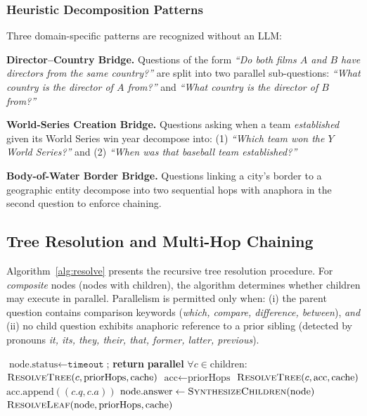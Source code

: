 \documentclass[conference]{IEEEtran}
\begin{document}
\subsubsection{Heuristic Decomposition Patterns}
\label{sec:heuristic}

Three domain-specific patterns are recognized without an LLM:

\textbf{Director--Country Bridge.}  Questions of the form
\textit{``Do both films $A$ and $B$ have directors from the same
country?''} are split into two parallel sub-questions:
\textit{``What country is the director of $A$ from?''} and
\textit{``What country is the director of $B$ from?''}

\textbf{World-Series Creation Bridge.}  Questions asking when a team
\emph{established} given its World Series win year decompose into:
(1) \textit{``Which team won the $Y$ World Series?''} and
(2) \textit{``When was that baseball team established?''}

\textbf{Body-of-Water Border Bridge.}  Questions linking a city's
border to a geographic entity decompose into two sequential hops
with anaphora in the second question to enforce chaining.

\subsection{Tree Resolution and Multi-Hop Chaining}
\label{sec:resolve}

Algorithm~\ref{alg:resolve} presents the recursive tree resolution
procedure.  For \emph{composite} nodes (nodes with children), the
algorithm determines whether children may execute in parallel.
Parallelism is permitted only when:
(i) the parent question contains comparison keywords
(\textit{which, compare, difference, between}), \emph{and}
(ii) no child question exhibits anaphoric reference to a prior sibling
(detected by pronouns \textit{it, its, they, their, that, former,
latter, previous}).

\begin{algorithm}[!t]
\caption{$\textsc{ResolveTree}(\text{node}, \text{priorHops}, \text{cache})$}
\label{alg:resolve}
\begin{algorithmic}[1]
  \STATE $\text{node.status} \leftarrow \texttt{timeout}$; \textbf{return}
\ENDIF
{}
    \STATE \textbf{parallel} $\forall c \in \text{children}$:
      $\textsc{ResolveTree}(c, \text{priorHops}, \text{cache})$
  \ELSE
    \STATE $\text{acc} \leftarrow \text{priorHops}$
      \STATE $\textsc{ResolveTree}(c, \text{acc}, \text{cache})$
        \STATE $\text{acc}.\text{append}((c.q, c.a))$ 
      \ENDIF
    \ENDFOR
  \ENDIF
  \STATE $\text{node.answer} \leftarrow \textsc{SynthesizeChildren}(\text{node})$
  \RETURN
\ENDIF
\STATE $\textsc{ResolveLeaf}(\text{node}, \text{priorHops}, \text{cache})$
\end{algorithmic}
\end{algorithm}
\end{document}
